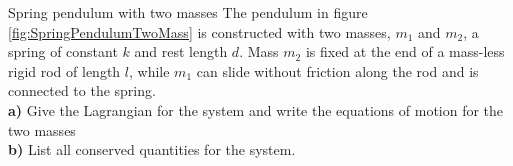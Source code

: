 \begin{problem}{Spring pendulum with two masses} The pendulum in figure \ref{fig:SpringPendulumTwoMass} is constructed with two masses, $m_1$ and $m_2$, a spring of constant $k$ and rest length $d$. Mass $m_2$ is fixed at the end of a mass-less rigid rod of length $l$, while $m_1$ can slide without friction along the rod and is connected to the spring.\\
\textbf{a)} Give the Lagrangian for the system and write the equations of motion for the two masses\\
\textbf{b)} List all conserved quantities for the system.
\label{prob_ConsSym_4}
\end{problem}




